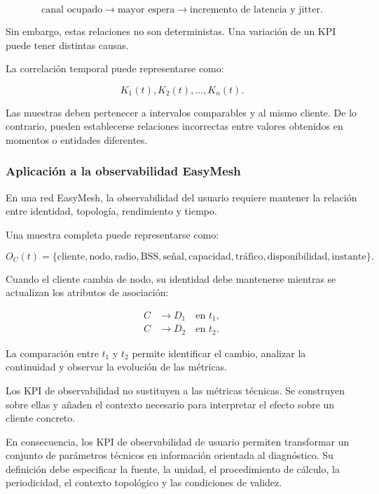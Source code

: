 \[
    \text{canal ocupado}
    \longrightarrow
    \text{mayor espera}
    \longrightarrow
    \text{incremento de latencia y jitter}.
\]

Sin embargo, estas relaciones no son deterministas. Una variación de un
KPI puede tener distintas causas.

La correlación temporal puede representarse como:

\[
    K_1(t),
    K_2(t),
    \ldots,
    K_n(t).
\]

Las muestras deben pertenecer a intervalos comparables y al mismo
cliente. De lo contrario, pueden establecerse relaciones incorrectas
entre valores obtenidos en momentos o entidades diferentes.


\subsubsection*{Aplicación a la observabilidad EasyMesh}

En una red EasyMesh, la observabilidad del usuario requiere mantener la
relación entre identidad, topología, rendimiento y tiempo.

Una muestra completa puede representarse como:

\[
    O_C(t)
    =
    \{
        \text{cliente},
        \text{nodo},
        \text{radio},
        \text{BSS},
        \text{señal},
        \text{capacidad},
        \text{tráfico},
        \text{disponibilidad},
        \text{instante}
    \}.
\]

Cuando el cliente cambia de nodo, su identidad debe mantenerse mientras
se actualizan los atributos de asociación:

\[
\begin{aligned}
    C
    &\longrightarrow
    D_1
    \quad
    \text{en } t_1,\\
    C
    &\longrightarrow
    D_2
    \quad
    \text{en } t_2.
\end{aligned}
\]

La comparación entre \(t_1\) y \(t_2\) permite identificar el cambio,
analizar la continuidad y observar la evolución de las métricas.

Los KPI de observabilidad no sustituyen a las métricas técnicas. Se
construyen sobre ellas y añaden el contexto necesario para interpretar
el efecto sobre un cliente concreto.

En consecuencia, los KPI de observabilidad de usuario permiten
transformar un conjunto de parámetros técnicos en información orientada
al diagnóstico. Su definición debe especificar la fuente, la unidad, el
procedimiento de cálculo, la periodicidad, el contexto topológico y las
condiciones de validez.

